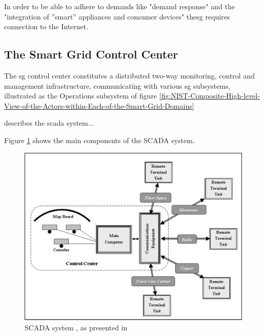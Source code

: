 In order to be able to adhere to demands like "demand response" and the "integration of ''smart'' appliances and consumer devices" the\acrlong{sg} requires connection to the Internet.\\









\subsection{The Smart Grid Control Center}
The \acrlong{sg} control center constitutes a distributed two-way monitoring, control and management infrastructure, communicating with various \acrlong{sg} subsystems, illustrated as the Operations subsystem of figure  \ref{fig:NIST-Composite-High-level-View-of-the-Actors-within-Each-of-the-Smart-Grid-Domains}



\cite{alcaraz2012security} describes the \acrlong{scada} system...















Figure \ref{fig:Blume-SCADA-system} shows the main components of the SCADA system.

\begin{figure}[ht]
\includegraphics[width=\linewidth]{figures/Blume-SCADA-system.png}
\caption{SCADA system , as presented in \cite{BlumeStevenW2007Epsb}}
\label{fig:Blume-SCADA-system}
\end{figure}





